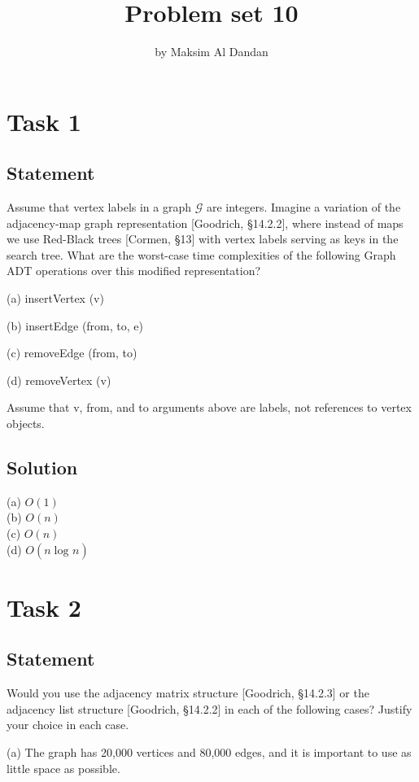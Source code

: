 \documentclass[10pt]{article}
\title{Problem set 10}
\author{by Maksim Al Dandan}
\begin{document}
\maketitle


\section{Task 1}
\subsection{Statement}

Assume that vertex labels in a graph $\mathcal{G}$ are integers. Imagine a variation of the adjacency-map graph representation [Goodrich, §14.2.2], where instead of maps we use Red-Black trees [Cormen, §13] with vertex labels serving as keys in the search tree. What are the worst-case time complexities of the following Graph ADT operations over this modified representation?

(a) insertVertex (v)

(b) insertEdge (from, to, e)

(c) removeEdge (from, to)

(d) removeVertex (v)

Assume that v, from, and to arguments above are labels, not references to vertex objects.

\subsection{Solution}

(a) $O(1)$ \\
(b) $O(n)$ \\
(c) $O(n)$ \\
(d) $O(n\log_{}n)$ \\

\section{Task 2}
\subsection{Statement}

Would you use the adjacency matrix structure [Goodrich, §14.2.3] or the adjacency list structure [Goodrich, §14.2.2] in each of the following cases? Justify your choice in each case.

(a) The graph has 20,000 vertices and 80,000 edges, and it is important to use as little space as possible.
\end{document}
